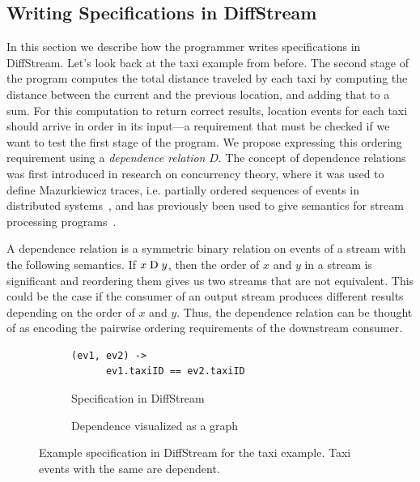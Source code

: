 \subsection{Writing Specifications in DiffStream}

In this section we describe how the programmer writes specifications in DiffStream.
Let's look back at the taxi example from before. The second stage of the program
computes the total distance traveled by each taxi by computing the
distance between the current and the previous location, and adding
that to a sum. For this computation to return correct results,
location events for each taxi should arrive in order in its input---a
requirement that must be checked if we want to test the first stage of
the program. We propose expressing this ordering requirement using a
\emph{dependence relation} $D$. The concept of dependence relations
was first introduced in research on concurrency theory, where it was
used to define Mazurkiewicz traces, i.e. partially ordered sequences
of events in distributed systems~\cite{mazurkiewicz1986trace},
and has previously been used to give semantics for stream processing programs~\cite{mamouras2019data}.

A dependence relation is a symmetric binary relation on events of a
stream with the following semantics.
If $x \mathrel{\mathrm{D}} y$, then the order of
$x$ and $y$ in a stream is significant and reordering them gives us
two streams that are not equivalent. This could be the case if the
consumer of an output stream produces different results depending on
the order of $x$ and $y$.  Thus, the dependence relation can be
thought of as encoding the pairwise ordering requirements of the
downstream consumer.

\begin{figure}[t]
  \centering \footnotesize{}
  \begin{subfigure}[b]{0.46\textwidth}
    \centering
    \begin{lstlisting}[basicstyle=\ttfamily\small]
  (ev1, ev2) ->
      ev1.taxiID == ev2.taxiID
    \end{lstlisting}
    \caption{Specification in DiffStream}
    \label{fig:simple-taxi-example-dependency-spec}
  \end{subfigure}%
  \qquad
  \begin{subfigure}[b]{0.46\textwidth}
    \centering
    \caption{Dependence visualized as a graph}
    \label{fig:simple-taxi-example-dependency-vis}
  \end{subfigure}%
  \caption{Example specification in DiffStream for the taxi example. Taxi events with the same  are dependent.}
  \label{fig:example-dependencies}
\end{figure}

